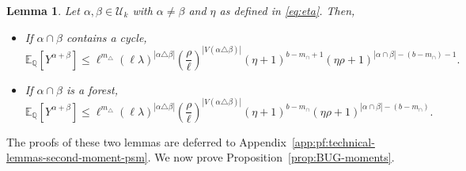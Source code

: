 \documentclass[11pt, letterpaper]{article}
\newtheorem{lemma}[theorem]{Lemma}
\numberwithin{equation}{section}
\newcommand{\E}{\mathbb{E}}
\newcommand{\QQ}{\mathbb{Q}}
\begin{document}
\begin{lemma}\label{lem:second-moment-not-equal}
Let $\alpha,\beta \in \mathcal{U}_k$ with $\alpha \ne \beta$ and $\eta$ as defined in \eqref{eq:eta}.
Then,
\begin{itemize}
    \item If $\alpha\cap \beta$ contains a cycle, $$\E_\QQ \left[Y^{\alpha+\beta}\right] \le \ell^{m_\triangle}(\ell\lambda)^{|\alpha \triangle \beta|}
 \left(\frac{\rho}{\ell}\right)^{|V(\alpha \triangle \beta)|}
 ( \eta + 1)^{b-m_\cap+1}
 (\eta \rho + 1)^{|\alpha \cap \beta| - (b - m_\cap)-1}.$$
 \item If $\alpha \cap \beta$ is a forest, $$\E_\QQ \left[Y^{\alpha+\beta}\right] \le \ell^{m_\triangle}(\ell\lambda)^{|\alpha \triangle \beta|}
 \left(\frac{\rho}{\ell}\right)^{|V(\alpha \triangle \beta)|}
 ( \eta + 1)^{b-m_\cap}
 (\eta \rho + 1)^{|\alpha \cap \beta| - (b - m_\cap)}.$$
\end{itemize}

\end{lemma}
\noindent The proofs of these two lemmas are deferred to
Appendix~\ref{app:pf:technical-lemmas-second-moment-psm}. We now prove Proposition~\ref{prop:BUG-moments}.
\end{document}
